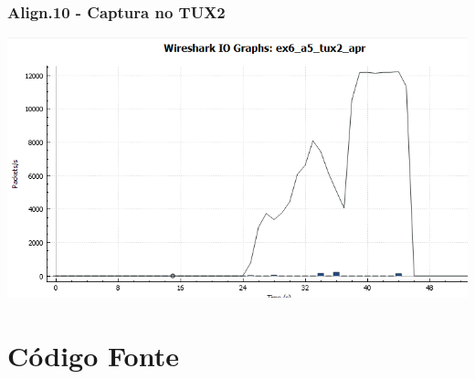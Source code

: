 \documentclass[11pt,a4paper,reqno]{report}
\numberwithin{equation}{section}
\begin{document}
\begin{appendices}
\subsection{Align.10 - Captura no TUX2}
\includegraphics[width=18cm]{ex6_a5_tux2_IO.png}

\chapter{Código Fonte}






\pagebreak


\end{appendices}
\end{document}
